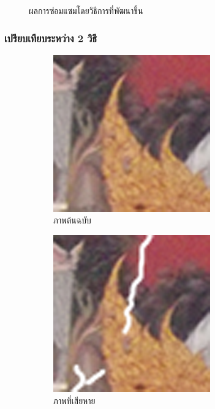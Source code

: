 \documentclass[xcolor=dvipsnames, xetex,serif]{beamer}
\numberwithin{equation}{section}
\begin{document}
\begin{frame}
\begin{figure}[H]
\begin{subfigure}{0.3\linewidth}
				\end{subfigure}
				\caption{ผลการซ่อมแซมโดยวิธีการที่พัฒนาขึ้น}
			\end{figure}
		\end{frame}
		\begin{frame}
			\frametitle{เปรียบเทียบระหว่าง 2 วิธี}
			\begin{figure}[H]
				\centering
				\begin{subfigure}{0.4\linewidth}
					\centering
					\includegraphics[width=0.6\linewidth]{images/result_ex4_scaleup/original.png}
					\caption{ภาพต้นฉบับ}
				\end{subfigure}
				\begin{subfigure}{0.4\linewidth}
					\centering
					\includegraphics[width=0.6\linewidth]{images/result_ex4_scaleup/toinpaint.png}
					\caption{ภาพที่เสียหาย}
				\end{subfigure}
				\begin{subfigure}{0.4\linewidth}
					\centering

\end{subfigure}
\end{figure}
\end{frame}
\end{document}
